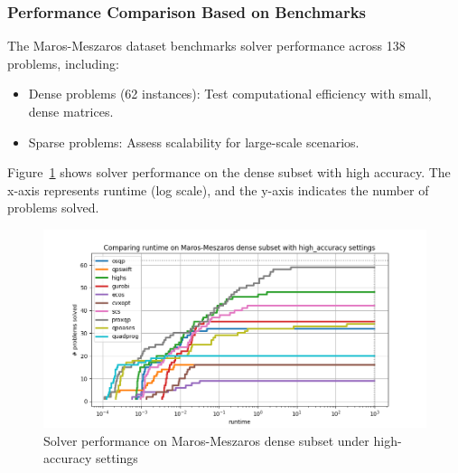 \documentclass{article}
\begin{document}
\subsubsection{Performance Comparison Based on Benchmarks}
The Maros-Meszaros dataset benchmarks solver performance across 138 problems, including:
\begin{itemize}
    \item Dense problems (62 instances): Test computational efficiency with small, dense matrices.
    \item Sparse problems: Assess scalability for large-scale scenarios.
\end{itemize}

Figure~\ref{fig:solver-performance} shows solver performance on the dense subset with high accuracy. The x-axis represents runtime (log scale), and the y-axis indicates the number of problems solved.

\begin{figure}[ht]
\centering
\includegraphics[width=\textwidth]{fig/runtimegraph.png}
\caption{Solver performance on Maros-Meszaros dense subset under high-accuracy settings}
\label{fig:solver-performance}
\end{figure}
\end{document}
